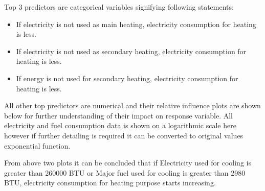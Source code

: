 \documentclass[letterpaper,12pt]{article}
\begin{document}
Top 3 predictors are categorical variables signifying following statements:
\begin{itemize}
\item If electricity is not used as main heating, electricity consumption for heating is less.
\item If electricity is not used as secondary heating, electricity consumption for heating is less.
\item If energy is not used for secondary heating, electricity consumption for heating is less.
\end{itemize}

All other top predictors are numerical and their relative influence plots are shown below for further understanding of their impact on response variable. All electricity and fuel consumption data is shown on a logarithmic scale here however if further detailing is required it can be converted to original values exponential function.

\begin{figure}[H]%
    \centering
    \qquad
    \label{fig:example}%
\end{figure}

From above two plots it can be concluded that if Electricity used for cooling is greater than 260000 BTU or Major fuel used for cooling is greater than 2980 BTU, electricity consumption for heating purpose starts increasing.
\end{document}
